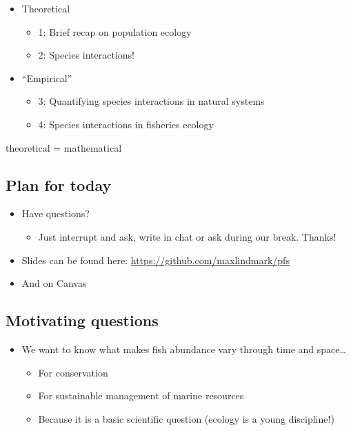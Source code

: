 \documentclass[
  letterpaper,
  DIV=11,
  numbers=noendperiod]{scrartcl}
\providecommand{\tightlist}{%
  \setlength{\itemsep}{0pt}\setlength{\parskip}{0pt}}\usepackage{longtable,booktabs,array}
\begin{document}
\begin{itemize}
\item
  Theoretical

  \begin{itemize}
  \item
    1: Brief recap on population ecology
  \item
    2: Species interactions!
  \end{itemize}
\item
  ``Empirical''

  \begin{itemize}
  \item
    3: Quantifying species interactions in natural systems
  \item
    4: Species interactions in fisheries ecology
  \end{itemize}
\end{itemize}

theoretical = mathematical

\hypertarget{plan-for-today-1}{%
\subsection{Plan for today}\label{plan-for-today-1}}

\begin{itemize}
\item
  Have questions?

  \begin{itemize}
  \tightlist
  \item
    Just interrupt and ask, write in chat or ask during our break.
    Thanks!
  \end{itemize}
\item
  Slides can be found here: \url{https://github.com/maxlindmark/pfs}
\item
  And on Canvas
\end{itemize}

\hypertarget{motivating-questions}{%
\subsection{Motivating questions}\label{motivating-questions}}

\begin{itemize}
\item
  We want to know what makes fish abundance vary through time and
  space\ldots{}

  \begin{itemize}
  \item
    For conservation
  \item
    For sustainable management of marine resources
  \item
    Because it is a basic scientific question (ecology is a young
    discipline!)
  \end{itemize}
\end{itemize}
\end{document}
